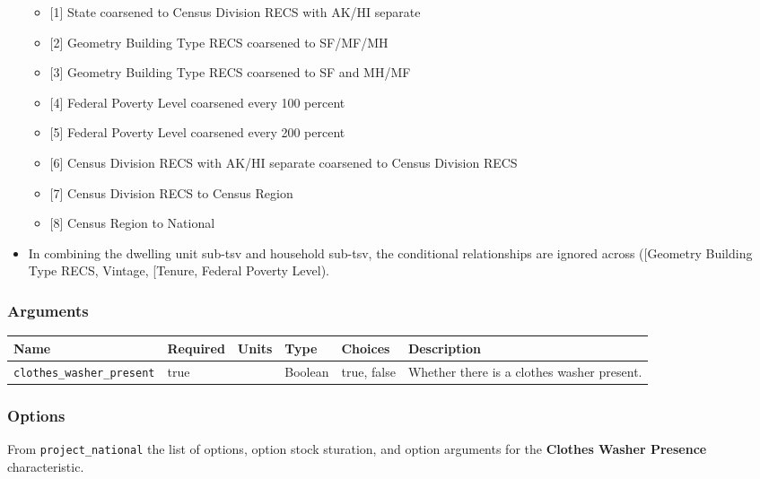 \begin{itemize}
\begin{itemize}
  \item
    {[}1{]} State coarsened to Census Division RECS with AK/HI separate
  \item
    {[}2{]} Geometry Building Type RECS coarsened to SF/MF/MH
  \item
    {[}3{]} Geometry Building Type RECS coarsened to SF and MH/MF
  \item
    {[}4{]} Federal Poverty Level coarsened every 100 percent
  \item
    {[}5{]} Federal Poverty Level coarsened every 200 percent
  \item
    {[}6{]} Census Division RECS with AK/HI separate coarsened to Census
    Division RECS
  \item
    {[}7{]} Census Division RECS to Census Region
  \item
    {[}8{]} Census Region to National
  \end{itemize}
\item
  In combining the dwelling unit sub-tsv and household sub-tsv, the
  conditional relationships are ignored across
  ({[}\textquotesingle Geometry Building Type RECS\textquotesingle,
  \textquotesingle Vintage\textquotesingle{]},
  {[}\textquotesingle Tenure\textquotesingle, \textquotesingle Federal
  Poverty Level\textquotesingle{]}).
\end{itemize}

\subsubsection{Arguments}\label{arguments-9}

\begin{longtable}[]{@{}llllll@{}}
\toprule\noalign{}
Name & Required & Units & Type & Choices & Description \\
\midrule\noalign{}
\endhead
\bottomrule\noalign{}
\endlastfoot
\texttt{clothes\_washer\_present} & true & & Boolean & true, false &
Whether there is a clothes washer present. \\
\end{longtable}

\subsubsection{Options}\label{options-18}

From \texttt{project\_national} the list of options, option stock
sturation, and option arguments for the \textbf{Clothes Washer Presence}
characteristic.

